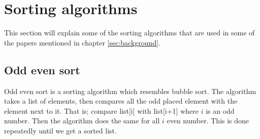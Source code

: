 \section{Sorting algorithms}
\label{app:sorting} This section will explain some of the sorting algorithms that are used in some of the papers mentioned in chapter \ref{sec:background}. 
\subsection{Odd even sort}
Odd even sort is a sorting algorithm which resembles bubble sort. The algorithm takes a list of elements, then compares all the odd placed element with the element next to it. That is; compare list[i] with list[i+1] where $i$ is an odd number. Then the algorithm does the same for all $i$ even number. This is done repeatedly until we get a sorted list.

